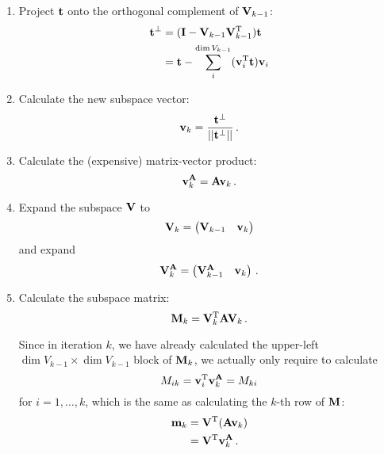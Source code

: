         \begin{enumerate}
            \item Project $\vb{t}$ onto the orthogonal complement of $\vb{V}_{k-1}$:
                \begin{align}
                    \vb{t}^{\perp} &= (\vb{I} - \vb{V}_{k-1} \vb{V}_{k-1}^{\text{T}}) \vb{t} \\
                    &= \vb{t} - \sum_i^{\dim{V_{k-1}}} (\vb{v}_i^{\text{T}} \vb{t}) \vb{v}_i
                \end{align}

            \item Calculate the new subspace vector:
                \begin{equation}
                    \vb{v}_k = \frac{\vb{t}^\perp}{|| \vb{t}^\perp ||} \thinspace .
                \end{equation}

            \item Calculate the (expensive) matrix-vector product:
                \begin{equation}
                    \vb{v}^{\vb{A}}_k = \vb{A} \vb{v}_k \thinspace .
                \end{equation}

            \item Expand the subspace $\vb{V}$ to
                \begin{equation}
                    \vb{V}_k = \begin{pmatrix} \vb{V}_{k-1} & \vb{v}_k \end{pmatrix}
                \end{equation}
                and expand
                \begin{equation}
                    \vb{V}^{\vb{A}}_k = \begin{pmatrix} \vb{V}^{\vb{A}}_{k-1} & \vb{v}_k \end{pmatrix} \thinspace .
                \end{equation}

            \item Calculate the subspace matrix:
                \begin{equation}
                    \vb{M}_k = \vb{V}^{\text{T}}_k \vb{A} \vb{V}_k \thinspace .
                \end{equation}

                Since in iteration $k$, we have already calculated the upper-left $\dim{V_{k-1}} \times \dim{V_{k-1}}$ block of $\vb{M}_k$, we actually only require to calculate
                \begin{equation}
                    M_{ik} = \vb{v}_i^{\text{T}} \vb{v}_k^{\vb{A}} = M_{ki}
                \end{equation}
                for $i = 1, \dots, k$, which is the same as calculating the $k$-th row of $\vb{M}$:
                \begin{align}
                    \vb{m}_k &= \vb{V}^{\text{T}} (\vb{A} \vb{v}_k) \\
                    &= \vb{V}^{\text{T}} \vb{v}^{\vb{A}}_k \thinspace .
                \end{align}


\end{enumerate}
